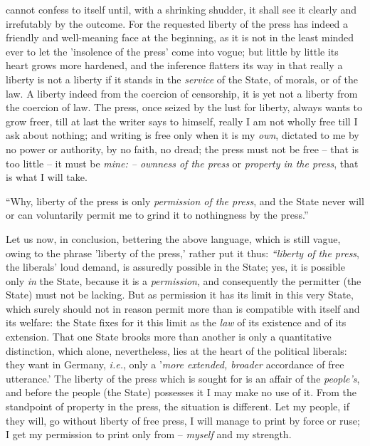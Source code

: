 cannot confess to itself until, with a shrinking shudder, it shall see it 
clearly and irrefutably by the outcome. For the requested liberty of the press 
has indeed a friendly and well-meaning face at the beginning, as it is not in 
the least minded ever to let the 'insolence of the press' come into vogue; but 
little by little its heart grows more hardened, and the inference flatters its 
way in that really a liberty is not a liberty if it stands in the 
\textit{service} of the State, of morals, or of the law. A liberty indeed from 
the coercion of censorship, it is yet not a liberty from the coercion of law. 
The press, once seized by the lust for liberty, always wants to grow freer, 
till at last the writer says to himself, really I am not wholly free till I 
ask about nothing; and writing is free only when it is my \textit{own}, 
dictated to me by no power or authority, by no faith, no dread; the press must 
not be free -- that is too little -- it must be \textit{mine: -- ownness of 
the press} or \textit{property in the press}, that is what I will take.

``Why, liberty of the press is only \textit{permission of the press}, and the 
State never will or can voluntarily permit me to grind it to nothingness by 
the press.''

Let us now, in conclusion, bettering the above language, which is still vague, 
owing to the phrase 'liberty of the press,' rather put it thus: 
\textit{``liberty of the press}, the liberals' loud demand, is assuredly 
possible in the State; yes, it is possible only \textit{in} the State, because 
it is a \textit{permission}, and consequently the permitter (the State) must 
not be lacking. But as permission it has its limit in this very State, which 
surely should not in reason permit more than is compatible with itself and its 
welfare: the State fixes for it this limit as the \textit{law} of its 
existence and of its extension. That one State brooks more than another is 
only a quantitative distinction, which alone, nevertheless, lies at the heart 
of the political liberals: they want in Germany, \textit{i.e.}, only a 
'\textit{more extended, broader} accordance of free utterance.' The liberty of 
the press which is sought for is an affair of the \textit{people's}, and 
before the people (the State) possesses it I may make no use of it. From the 
standpoint of property in the press, the situation is different. Let my 
people, if they will, go without liberty of free press, I will manage to print 
by force or ruse; I get my permission to print only from -- \textit{myself} 
and my strength.

